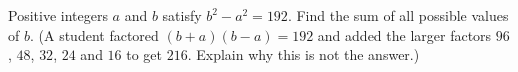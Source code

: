 Positive integers $a$ and $b$ satisfy $b^2-a^2=192$. Find the sum of all possible values of $b$. (A student factored $(b+a)(b-a)=192$ and added the larger factors $96$, $48$, $32$, $24$ and $16$ to get $216$. Explain why this is not the answer.)
